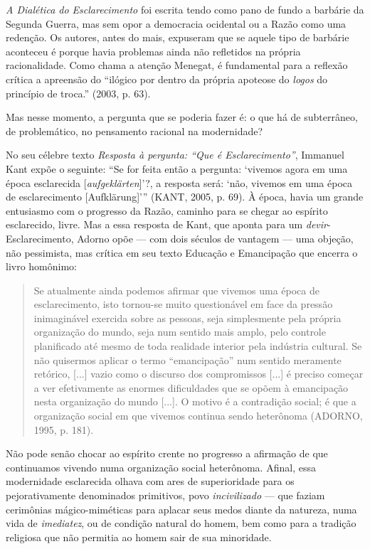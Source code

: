 \emph{A Dialética do Esclarecimento} foi escrita tendo como pano de
fundo a barbárie da Segunda Guerra, mas sem opor a democracia ocidental
ou a Razão como uma redenção. Os autores, antes do mais, expuseram que
se aquele tipo de barbárie aconteceu é porque havia problemas ainda não
refletidos na própria racionalidade. Como chama a atenção Menegat, é
fundamental para a reflexão crítica a apreensão do ``ilógico por dentro
da própria apoteose do \emph{logos} do princípio de troca.'' (2003, p.
63).

Mas nesse momento, a pergunta que se poderia fazer é: o que há de
subterrâneo, de problemático, no pensamento racional na modernidade?

No seu célebre texto \emph{Resposta à pergunta: ``Que é
Esclarecimento''}, Immanuel Kant expõe o seguinte: ``Se for feita então
a pergunta: `vivemos agora em uma época esclarecida
{[}\emph{aufgeklärten}{]}'?, a resposta será: `não, vivemos em uma época
de esclarecimento {[}Aufklärung{]}''' (KANT, 2005, p. 69). À época,
havia um grande entusiasmo com o progresso da Razão, caminho para se
chegar ao espírito esclarecido, livre. Mas a essa resposta de Kant, que
aponta para um \emph{devir}-Esclarecimento, Adorno opõe --- com dois
séculos de vantagem --- uma objeção, não pessimista, mas crítica em seu
texto Educação e Emancipação que encerra o livro homônimo:

\begin{quote}
Se atualmente ainda podemos afirmar que vivemos uma época de
esclarecimento, isto tornou-se muito questionável em face da pressão
inimaginável exercida sobre as pessoas, seja simplesmente pela própria
organização do mundo, seja num sentido mais amplo, pelo controle
planificado até mesmo de toda realidade interior pela indústria
cultural. Se não quisermos aplicar o termo ``emancipação'' num sentido
meramente retórico, {[}...{]} vazio como o discurso dos compromissos
{[}...{]} é preciso começar a ver efetivamente as enormes dificuldades
que se opõem à emancipação nesta organização do mundo {[}...{]}. O
motivo é a contradição social; é que a organização social em que vivemos
continua sendo heterônoma (ADORNO, 1995, p. 181).
\end{quote}

Não pode senão chocar ao espírito crente no progresso a afirmação de que
continuamos vivendo numa organização social heterônoma. Afinal, essa
modernidade esclarecida olhava com ares de superioridade para os
pejorativamente denominados primitivos, povo \emph{incivilizado} --- que
faziam cerimônias mágico-miméticas para aplacar seus medos diante da
natureza, numa vida de \emph{imediatez}, ou de condição natural do
homem, bem como para a tradição religiosa que não permitia ao homem sair
de sua minoridade.

